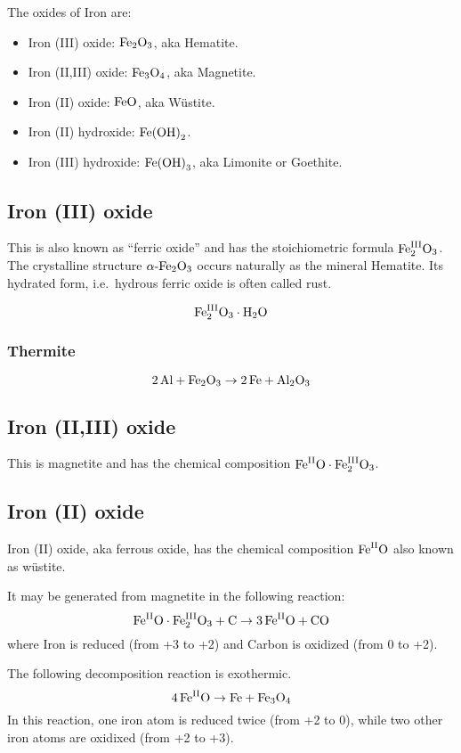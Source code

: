 \documentclass[a4paper,14pt]{extarticle}
\def\mhyphen{{\hbox{-}}}
\def\Al{{\rm Al}}
\def\H{{\rm H}}
\def\O{{\rm O}}
\def\C{{\rm C}}
\def\Fe{{\rm Fe}}
\def\II{{\rm II}}
\def\III{{\rm III}}
\begin{document}
The oxides of Iron are:

\begin{itemize}
    \item Iron (III) oxide: $\Fe_2\O_3$, aka Hematite.
    \item Iron (II,III) oxide: $\Fe_3\O_4$, aka Magnetite.
    \item Iron (II) oxide: $\Fe\O$, aka Wüstite.
    \item Iron (II) hydroxide: $\Fe{(\O\H)}_2$.
    \item Iron (III) hydroxide: $\Fe{(\O\H)}_3$, aka Limonite or Goethite.
\end{itemize}

\subsection{Iron (III) oxide}
This is also known as ``ferric oxide'' and has the stoichiometric formula $\Fe^{\III}_2\O_3$.
The crystalline structure $\alpha\mhyphen\Fe_2\O_3 $ occurs naturally as the mineral Hematite.
Its hydrated form, i.e.\ hydrous ferric oxide is often called rust.

\[
    \Fe^\III_2\O_3 \cdot \H_2\O
\]

\subsubsection{Thermite}
\[
    2\,\Al + \Fe_2\O_3 \rightarrow 2 \, \Fe + \Al_2\O_3
\]

\subsection{Iron (II,III) oxide}
This is magnetite and has the chemical composition
$\Fe^{\II}\O\cdot\Fe^{\III}_2\O_3$.

\subsection{Iron (II) oxide}
Iron (II) oxide, aka ferrous oxide, has the chemical composition $\Fe^{\II}\O$ also known as wüstite.

It may be generated from magnetite in the following reaction:
\[
    \Fe^\II\O\cdot\Fe^\III_2\O_3 + \C \rightarrow 3\,\Fe^\II\O + \C\O
\]
where Iron is reduced (from +3 to +2) and Carbon is oxidized (from 0 to +2).

The following decomposition reaction is exothermic.
\[
    4\,\Fe^\II\O \rightarrow \Fe + \Fe_3\O_4
\]
In this reaction, one iron atom is reduced twice (from +2 to 0), while two other iron atoms are oxidixed (from +2 to
+3).
\end{document}
